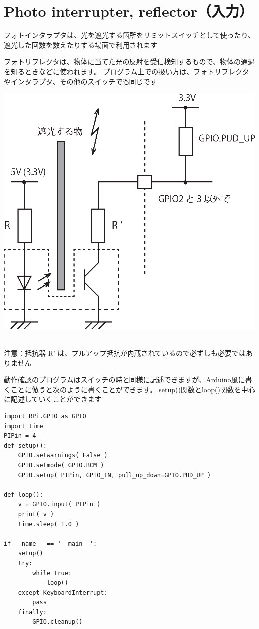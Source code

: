 \documentclass[uplatex,a4paper,11pt,oneside,openany]{jsbook}
\begin{document}
\newpage

\section{Photo interrupter, reflector（入力）}

フォトインタラプタは、光を遮光する箇所をリミットスイッチとして使ったり、遮光した回数を数えたりする場面で利用されます

フォトリフレクタは、物体に当てた光の反射を受信検知するもので、物体の通過を知るときなどに使われます。
プログラム上での扱い方は、フォトリフレクタやインタラプタ、その他のスイッチでも同じです

\begin{minipage}{0.90\hsize}
      \centering
      \includegraphics[keepaspectratio, scale=0.5, angle=0]
                      {figures/eps/PhotoInterrupter.eps}
                      \label{fig:PI}
\end{minipage}\\

注意：抵抗器 R' は、プルアップ抵抗が内蔵されているので必ずしも必要ではありません

動作確認のプログラムはスイッチの時と同様に記述できますが、Arduino風に書くことに倣うと次のように書くことができます。
setup()関数とloop()関数を中心に記述していくことができます

\begin{lstlisting}[caption=Photo interrupter(Python),label=prog2]
import RPi.GPIO as GPIO
import time
PIPin = 4
def setup():
    GPIO.setwarnings( False )
    GPIO.setmode( GPIO.BCM )
    GPIO.setup( PIPin, GPIO_IN, pull_up_down=GPIO.PUD_UP )

def loop():
    v = GPIO.input( PIPin )
    print( v )
    time.sleep( 1.0 )

if __name__ == '__main__':
    setup()
    try:
        while True:
            loop()
    except KeyboardInterrupt:
        pass
    finally:
        GPIO.cleanup()
\end{lstlisting}%
\end{document}
